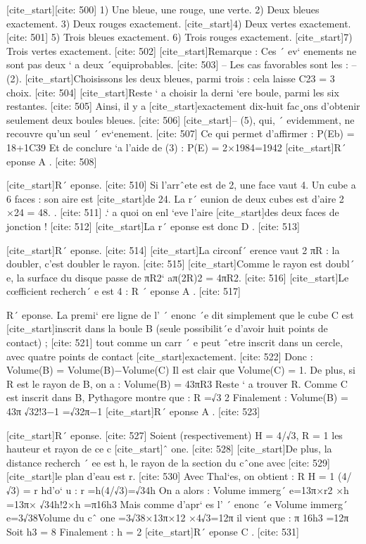  [cite_start][cite: 500]
1) Une bleue, une rouge, une verte.
 2) Deux bleues exactement.
 3) Deux rouges exactement.
 [cite_start]4) Deux vertes exactement. [cite: 501]
5) Trois bleues exactement.
 6) Trois rouges exactement.
 [cite_start]7) Trois vertes exactement. [cite: 502]
[cite_start]Remarque : Ces ´ ev` enements ne sont pas deux ` a deux ´equiprobables. [cite: 503]
– Les cas favorables sont les :
 – (2). [cite_start]Choisissons les deux bleues, parmi trois : cela laisse C23 = 3 choix. [cite: 504]
[cite_start]Reste ` a choisir la derni `ere boule, parmi les six restantes. [cite: 505]
Ainsi, il y a 
 [cite_start]exactement dix-huit fac¸ons d’obtenir seulement deux boules bleues. [cite: 506]
[cite_start]– (5), qui, ´ evidemment, ne recouvre qu’un seul ´ ev`enement. [cite: 507]
Ce qui permet d’affirmer :
 P(Eb) = 18+1C39
 Et de conclure `a l’aide de (3) : 
 P(E) = 2×1984=1942
 [cite_start]R´ eponse A . [cite: 508]

[cite_start]R´ eponse. [cite: 510]
Si l’arrˆete est de 2, une face vaut 4. Un cube a 6 faces : son aire est 
 [cite_start]de 24. La r´ eunion de deux cubes est d’aire 2 ×24 = 48. . [cite: 511]
.` a quoi on enl `eve l’aire 
 [cite_start]des deux faces de jonction ! [cite: 512]
[cite_start]La r´ eponse est donc D . [cite: 513]

[cite_start]R´ eponse. [cite: 514]
[cite_start]La circonf´ erence vaut 2 πR : la doubler, c’est doubler le rayon. [cite: 515]
[cite_start]Comme le rayon est doubl´ e, la surface du disque passe de πR2` aπ(2R)2 = 4πR2. [cite: 516]
[cite_start]Le cœfficient recherch´ e est 4 : R ´ eponse A . [cite: 517]

R´ eponse. La premi` ere ligne de l’ ´ enonc ´e dit simplement que le cube C est 
 [cite_start]inscrit dans la boule B (seule possibilit´e d’avoir huit points de contact) ; [cite: 521]
tout 
 comme un carr
 ´ e peut ˆetre inscrit dans un cercle, avec quatre points de contact 
 [cite_start]exactement. [cite: 522]
Donc :
 Volume(B\C) = Volume(B)−Volume(C)
 Il est clair que Volume(C) = 1. De plus, si R est le rayon de B, on a :
 Volume(B) = 43πR3
 Reste ` a trouver R.
 Comme C est inscrit dans B, Pythagore montre que :
 R =√3
 2
 Finalement :
 Volume(B\C) = 43π √32!3−1 =√32π−1
 [cite_start]R´ eponse A . [cite: 523]

[cite_start]R´ eponse. [cite: 527]
Soient (respectivement) H = 4/√3, R = 1 les hauteur et rayon de
 ce c
 [cite_start]ˆ one. [cite: 528]
[cite_start]De plus, la distance recherch ´ ee est h, le rayon de la section du cˆone avec [cite: 529]
[cite_start]le plan d’eau est r. [cite: 530]
Avec Thal`es, on obtient : 
 R
 H
 =
 1
 (4/√3)
 =
 r
 hd’o` u : r =h(4/√3)=√34h
 On a alors :
 Volume immerg´ e=13π×r2 ×h =13π× √34h!2×h =π16h3
 Mais comme d’apr` es l’ ´ enonc ´e
 Volume immerg´ e=3√38Volume du cˆ one =3√38×13π×12 ×4√3=12π
 il vient que :
 π
 16h3 =12π
 Soit
 h3 = 8
 Finalement :
 h = 2
 [cite_start]R´ eponse C . [cite: 531]

